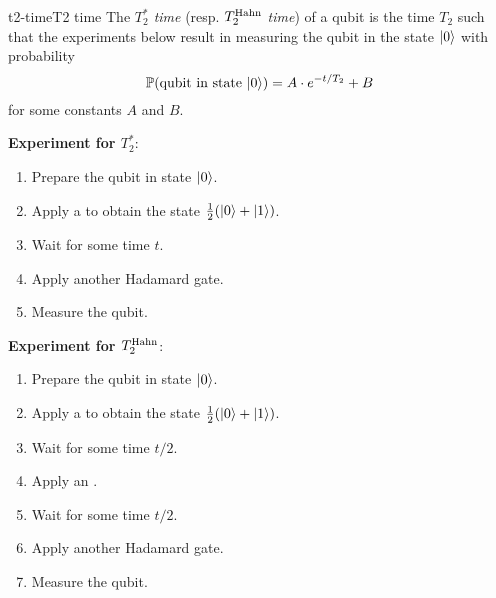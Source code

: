 \begin{topic}{t2-time}{T2 time}
    The \emph{$T_2^*$ time} (resp. \emph{$T_2^\textup{Hahn}$ time}) of a qubit is the time $T_2$ such that the experiments below result in measuring the qubit in the state $|0\rangle$ with probability
    \[ \mathbb{P}(\textup{qubit in state }|0\rangle) = A \cdot e^{-t / T_2} + B \]
    for some constants $A$ and $B$.

    \textbf{Experiment for $T_2^*$}:
    \begin{enumerate}[label=(\arabic*)]
        \item Prepare the qubit in state $|0\rangle$.
        \item Apply a  to obtain the state $\tfrac{1}{2} (|0\rangle + |1\rangle)$.
        \item Wait for some time $t$.
        \item Apply another Hadamard gate.
        \item Measure the qubit.
    \end{enumerate}
    \textbf{Experiment for $T_2^\textup{Hahn}$}:
    \begin{enumerate}[label=(\arabic*)]
        \item Prepare the qubit in state $|0\rangle$.
        \item Apply a  to obtain the state $\tfrac{1}{2} (|0\rangle + |1\rangle)$.
        \item Wait for some time $t / 2$.
        \item Apply an .
        \item Wait for some time $t / 2$.
        \item Apply another Hadamard gate.
        \item Measure the qubit.
    \end{enumerate}
\end{topic}


